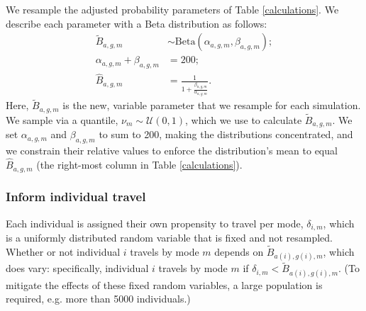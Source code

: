 \documentclass{article}
\begin{document}
\begin{appendix}
We resample the adjusted probability parameters of Table \ref{calculations}. We describe each parameter with a Beta distribution as follows:
\begin{align}\label{pitilde}
\tilde{B}_{a,g,m} & \sim \text{Beta}(\alpha_{a,g,m},\beta_{a,g,m}); \\
\alpha_{a,g,m}+\beta_{a,g,m} & = 200; \\
\hat{B}_{a,g,m} & = \frac{1}{1+\frac{\beta_{a,g,m}}{\alpha_{a,g,m}}}.
\end{align}
Here, $\tilde{B}_{a,g,m}$ is the new, variable parameter that we resample for each simulation. We sample via a quantile, $\nu_m\sim\mathcal{U}(0,1)$, which we use to calculate $\tilde{B}_{a,g,m}$.  We set $\alpha_{a,g,m}$ and $\beta_{a,g,m}$ to sum to 200, making the distributions concentrated, and we constrain their relative values to enforce the distribution's mean to equal $\hat{B}_{a,g,m}$ (the right-most column in Table \ref{calculations}). %


\subsubsection{Inform individual travel}

Each individual is assigned their own propensity to travel per mode, $\delta_{i,m}$, which is a uniformly distributed random variable that is fixed and not resampled. Whether or not individual $i$ travels by mode $m$ depends on $\tilde{B}_{a(i),g(i),m}$, which does vary: specifically, individual $i$ travels by mode $m$ if $\delta_{i,m}<\tilde{B}_{a(i),g(i),m}$. (To mitigate the effects of these fixed random variables, a large population is required, e.g. more than 5000 individuals.)



\end{appendix}
\end{document}
